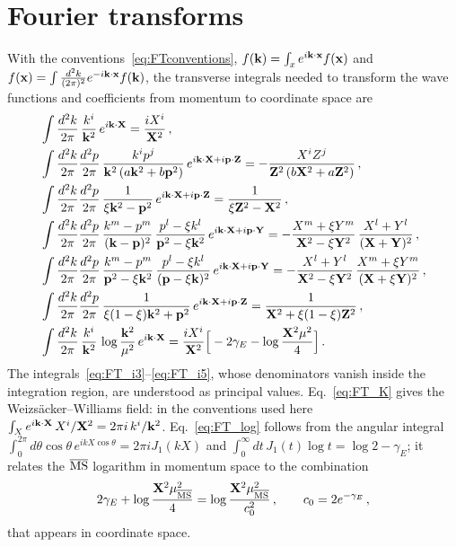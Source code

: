 \section{Fourier transforms}\label{app:fourier}

With the conventions~\eqref{eq:FTconventions}, $f(\mathbf{k})=\int_xe^{i\mathbf{k}\cdot\mathbf{x}}f(\mathbf{x})$ and $f(\mathbf{x})=\int\frac{d^2k}{(2\pi)^2}e^{-i\mathbf{k}\cdot\mathbf{x}}f(\mathbf{k})$, the transverse integrals needed to transform the wave functions and coefficients from momentum to coordinate space are~\cite{Radhakrishnan:2026soft}
\begin{align}
&\int\frac{d^2k}{2\pi}\,\frac{k^i}{\mathbf{k}^2}\,e^{i\mathbf{k}\cdot\mathbf{X}}=\frac{iX^i}{\mathbf{X}^2}\,,\label{eq:FT_K}\\
&\int\frac{d^2k}{2\pi}\frac{d^2p}{2\pi}\,\frac{k^ip^j}{\mathbf{k}^2\,(a\mathbf{k}^2+b\mathbf{p}^2)}\,e^{i\mathbf{k}\cdot\mathbf{X}+i\mathbf{p}\cdot\mathbf{Z}}=-\frac{X^iZ^j}{\mathbf{Z}^2\,(b\mathbf{X}^2+a\mathbf{Z}^2)}\,,\label{eq:FT_i2}\\
&\int\frac{d^2k}{2\pi}\frac{d^2p}{2\pi}\,\frac{1}{\xi\mathbf{k}^2-\mathbf{p}^2}\,e^{i\mathbf{k}\cdot\mathbf{X}+i\mathbf{p}\cdot\mathbf{Z}}=\frac{1}{\xi\mathbf{Z}^2-\mathbf{X}^2}\,,\label{eq:FT_i3}\\
&\int\frac{d^2k}{2\pi}\frac{d^2p}{2\pi}\,\frac{k^m-p^m}{(\mathbf{k}-\mathbf{p})^2}\,\frac{p^l-\xi k^l}{\mathbf{p}^2-\xi\mathbf{k}^2}\,e^{i\mathbf{k}\cdot\mathbf{X}+i\mathbf{p}\cdot\mathbf{Y}}=-\frac{X^m+\xi Y^m}{\mathbf{X}^2-\xi\mathbf{Y}^2}\,\frac{X^l+Y^l}{(\mathbf{X}+\mathbf{Y})^2}\,,\label{eq:FT_i4}\\
&\int\frac{d^2k}{2\pi}\frac{d^2p}{2\pi}\,\frac{k^m-p^m}{\mathbf{p}^2-\xi\mathbf{k}^2}\,\frac{p^l-\xi k^l}{(\mathbf{p}-\xi\mathbf{k})^2}\,e^{i\mathbf{k}\cdot\mathbf{X}+i\mathbf{p}\cdot\mathbf{Y}}=-\frac{X^l+Y^l}{\mathbf{X}^2-\xi\mathbf{Y}^2}\,\frac{X^m+\xi Y^m}{(\mathbf{X}+\xi\mathbf{Y})^2}\,,\label{eq:FT_i5}\\
&\int\frac{d^2k}{2\pi}\frac{d^2p}{2\pi}\,\frac{1}{\xi(1-\xi)\mathbf{k}^2+\mathbf{p}^2}\,e^{i\mathbf{k}\cdot\mathbf{X}+i\mathbf{p}\cdot\mathbf{Z}}=\frac{1}{\mathbf{X}^2+\xi(1-\xi)\mathbf{Z}^2}\,,\label{eq:FT_i7}\\
&\int\frac{d^2k}{2\pi}\,\frac{k^i}{\mathbf{k}^2}\,\log\frac{\mathbf{k}^2}{\mu^2}\,e^{i\mathbf{k}\cdot\mathbf{X}}=\frac{iX^i}{\mathbf{X}^2}\Big[-2\gamma_E-\log\frac{\mathbf{X}^2\mu^2}{4}\Big]\,.\label{eq:FT_log}
\end{align}
The integrals~\eqref{eq:FT_i3}--\eqref{eq:FT_i5}, whose denominators vanish inside the integration region, are understood as principal values. Eq.~\eqref{eq:FT_K} gives the Weizs\"acker--Williams field: in the conventions used here $\int_Xe^{i\mathbf{k}\cdot\mathbf{X}}\,X^i/\mathbf{X}^2=2\pi i\,k^i/\mathbf{k}^2$. Eq.~\eqref{eq:FT_log} follows from the angular integral $\int_0^{2\pi}d\theta\cos\theta\,e^{ikX\cos\theta}=2\pi iJ_1(kX)$ and $\int_0^\infty dt\,J_1(t)\log t=\log2-\gamma_E$; it relates the $\overline{\rm MS}$ logarithm in momentum space to the combination
\begin{align}\label{eq:c0}
2\gamma_E+\log\frac{\mathbf{X}^2\mu^2_{\overline{\rm MS}}}{4}=\log\frac{\mathbf{X}^2\mu^2_{\overline{\rm MS}}}{c_0^2}\,,\qquad c_0=2e^{-\gamma_E}\,,
\end{align}
that appears in coordinate space.
